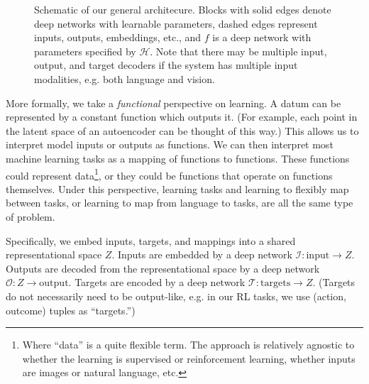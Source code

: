 \documentclass{article}
\begin{document}
\begin{figure}
\caption{Schematic of our general architecure. Blocks with solid edges denote deep networks with learnable parameters, dashed edges represent inputs, outputs, embeddings, etc., and $f$ is a deep network with parameters specified by $\mathcal{H}$. Note that there may be multiple input, output, and target decoders if the system has multiple input modalities, e.g. both language and vision.} \label{architecture_fig}
\end{figure}
More formally, we take a \emph{functional} perspective on learning. A datum can be represented by a constant function which outputs it. (For example, each point in the latent space of an autoencoder can be thought of this way.) This allows us to interpret model inputs or outputs as functions. We can then interpret most machine learning tasks as a mapping of functions to functions. These functions could represent data\footnote{Where ``data'' is a quite flexible term. The approach is relatively agnostic to whether the learning is supervised or reinforcement learning, whether inputs are images or natural language, etc.}, or they could be functions that operate on functions themselves. Under this perspective, learning tasks and learning to flexibly map between tasks, or learning to map from language to tasks, are all the same type of problem. \par
Specifically, we embed inputs, targets, and mappings into a shared representational space $Z$. Inputs are embedded by a deep network $\mathcal{I}: \text{input} \rightarrow Z$. Outputs are decoded from the representational space by a deep network $\mathcal{O}: Z \rightarrow \text{output}$. Targets are encoded by a deep network $\mathcal{T}: \text{targets} \rightarrow Z$. (Targets do not necessarily need to be output-like, e.g. in our RL tasks, we use (action, outcome) tuples as ``targets.'') \par
\end{document}
